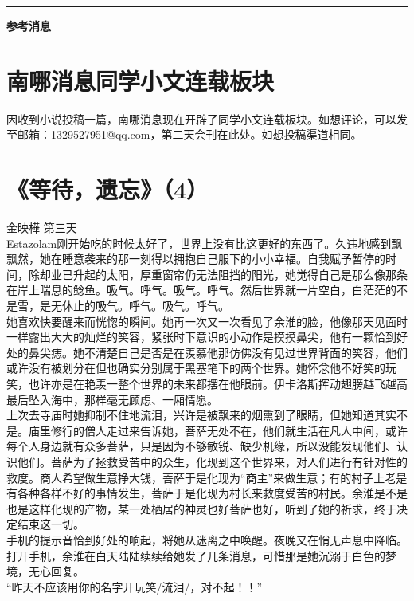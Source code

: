 \documentclass[letterpaper, 12pt]{article}
\begin{document}
\hrule
\vspace{4mm}
\centerline{\huge\textbf{参考消息}}
\begin{multicols}{2}
\section{南哪消息同学小文连载板块}
因收到小说投稿一篇，南哪消息现在开辟了同学小文连载板块。如想评论，可以发至邮箱：1329527951@qq.com，第二天会刊在此处。如想投稿渠道相同。
\section{《等待，遗忘》（4）}
金映樺
\newCJKfontfamily{}\fan
第三天\\

  Estazolam刚开始吃的时候太好了，世界上没有比这更好的东西了。久违地感到飘飘然，她在睡意袭来的那一刻得以拥抱自己服下的小小幸福。自我赋予暂停的时间，除却业已升起的太阳，厚重窗帘仍无法阻挡的阳光，她觉得自己是那么像那条在岸上喘息的鲶鱼。吸气。呼气。吸气。呼气。然后世界就一片空白，白茫茫的不是雪，是无休止的吸气。呼气。吸气。呼气。\\
  
  她喜欢快要醒来而恍惚的瞬间。她再一次又一次看见了余淮的脸，他像那天见面时一样露出大大的灿烂的笑容，紧张时下意识的小动作是摸摸鼻尖，他有一颗恰到好处的鼻尖痣。她不清楚自己是否是在羨慕他那仿佛没有见过世界背面的笑容，他们或许没有被划分在但也确实分别属于黑塞笔下的两个世界。她怀念他不好笑的玩笑，也许亦是在艳羡一整个世界的未来都摆在他眼前。伊卡洛斯挥动翅膀越飞越高最后坠入海中，那样毫无顾虑、一厢情愿。\\
  
上次去寺庙时她抑制不住地流泪，兴许是被飘来的烟熏到了眼睛，但她知道其实不是。庙里修行的僧人走过来告诉她，菩萨无处不在，他们就生活在凡人中间，或许每个人身边就有众多菩萨，只是因为不够敏锐、缺少机缘，所以没能发现他们、认识他们。菩萨为了拯救受苦中的众生，化现到这个世界来，对人们进行有针对性的救度。商人希望做生意挣大钱，菩萨于是化现为“商主”来做生意；有的村子上老是有各种各样不好的事情发生，菩萨于是化现为村长来救度受苦的村民。余淮是不是也是这样化现的产物，某一处栖居的神灵也好菩萨也好，听到了她的祈求，终于决定结束这一切。\\

  手机的提示音恰到好处的响起，将她从迷离之中唤醒。夜晚又在悄无声息中降临。打开手机，余淮在白天陆陆续续给她发了几条消息，可惜那是她沉溺于白色的梦境，无心回复。\\
  
“昨天不应该用你的名字开玩笑/流泪/，对不起！！”\\


\end{multicols}
\end{document}
